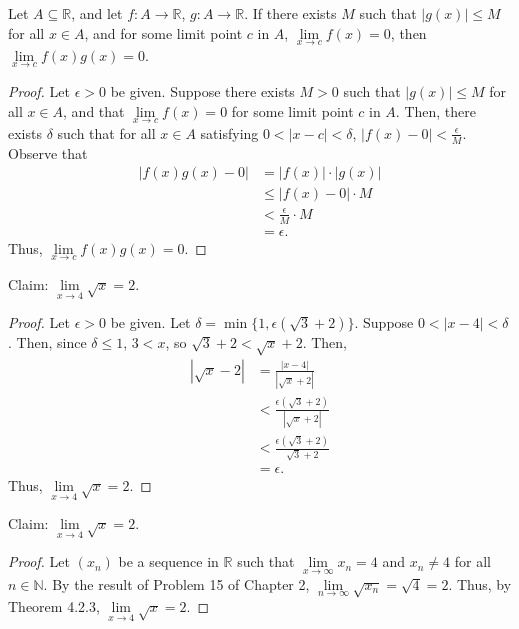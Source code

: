 \documentclass[12pt]{article}
\begin{document}
\newpage
{} Let $A \subseteq \mathbb R$, and let $f:A \to \mathbb R$, $g: A \to \mathbb R$. If there exists $M$ such that $|g(x)| \leq M$ for all $x \in A$, and for some limit point $c$ in $A$, $\lim\limits_{x \to c} f(x) = 0$, then $\lim\limits_{x \to c}f(x)g(x) = 0$.
\begin{proof}
    Let $\epsilon > 0$ be given.
    Suppose there exists $M>0$ such that $|g(x)|\leq M$ for all $x \in A$, and that $\lim\limits_{x \to c} f(x) = 0$ for some limit point $c$ in $A$. 
    Then, there exists $\delta$ such that for all $x \in A$ satisfying $0 < |x -c| < \delta$, $|f(x) - 0| < \frac\epsilon M$.
    Observe that
    \begin{align*}
        |f(x)g(x) - 0| &= |f(x)| \cdot |g(x)| \\
                       &\leq |f(x) - 0| \cdot M \\
                       &< \frac\epsilon M \cdot M \\
                       &= \epsilon.
    \end{align*}
    Thus, $\lim\limits_{x \to c}f(x)g(x) = 0$.
\end{proof}


\newpage
{}

\medskip
{} Claim: $\lim\limits_{x \to 4} \sqrt x = 2$.
\begin{proof}
    Let $\epsilon > 0$ be given.
    Let $\delta = \min\{1, \epsilon(\sqrt3 + 2)\}$.
    Suppose $0 < |x - 4| < \delta$.
    Then, since $\delta \leq 1$, $3 < x$, so $\sqrt3 + 2 < \sqrt x + 2$.
    Then,
    \begin{align*}
        |\sqrt x - 2| &= \frac{|x - 4|}{|\sqrt x + 2|} \\
                      &< \frac{\epsilon(\sqrt3 + 2)}{|\sqrt x + 2|} \\
                      &< \frac{\epsilon(\sqrt3 + 2)}{\sqrt3 + 2} \\
                      &= \epsilon.
    \end{align*}
    Thus, $\lim\limits_{x \to 4} \sqrt x = 2$.
\end{proof}

\medskip
{} Claim: $\lim\limits_{x \to 4} \sqrt x = 2$.
\begin{proof}
    Let $(x_n)$ be a sequence in $\mathbb R$ such that $\lim\limits_{x \to \infty} x_n = 4$ and $x_n \neq 4$ for all $n \in \mathbb N$. By the result of Problem 15 of Chapter 2, $\lim\limits_{n \to \infty} \sqrt{x_n} = \sqrt4 = 2$. Thus, by Theorem 4.2.3, $\lim\limits_{x\to4} \sqrt x = 2$.
\end{proof}
\end{document}
